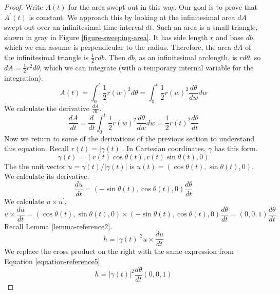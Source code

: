 \documentclass[fleqn,letterpaper]{report}
\begin{document}
\begin{proof}
Write $A(t)$ for the area swept out in this way. Our goal is
to prove that $A^\prime(t)$ is constant. We approach this by
looking at the infinitesimal area $dA$ swept out over an
infinitesimal time interval $dt$. Such an area is a small
triangle, shown in gray in Figure \ref{figure-sweeping-area}. It has
side length $r$ and base $db$, which we can assume is
perpendicular to the radius.  Therefore, the area $dA$ of the
infinitesimal triangle is $\frac{1}{2} r db$. Then $db$, as an
infinitesimal arclength, is $rd\theta$, so $dA = \frac{1}{2}
r^2 d\theta$, which we can integrate (with a temporary
internal variable for the integration).
\begin{equation*}
A(t) = \int_0^t \frac{1}{2} r(w)^2 d\theta = \int_0^t \frac{1}{2}
r(w)^2 \frac{d\theta}{dw} dw 
\end{equation*}
We calculate the derivative $\frac{dA}{dt}$.
\begin{equation*}
\frac{dA}{dt} = \frac{d}{dt} \int_0^t \frac{1}{2} r(w)^2
\frac{d\theta}{dw} dw = \frac{1}{2} r(t)^2 \frac{d\theta}{dt}
\end{equation*}
Now we return to some of the derivations of the previous section
to understand this equation. Recall $r(t) = |\gamma(t)|$. In
Cartesian coordinates, $\gamma$ has this form.
\begin{equation*}
\gamma(t) = (r(t) \cos \theta(t), r(t) \sin \theta(t), 0) 
\end{equation*}
The the unit vector $u = \gamma(t) / |\gamma(t)|$ is $u(t) =
(\cos \theta (t), \sin \theta(t),0)$. We calculate its
derivative.
\begin{equation}
\label{equation-reference6}
\frac{du}{dt} = (-\sin \theta(t), \cos \theta(t), 0)
\frac{d\theta}{dt} 
\end{equation}
We calculate $u \times u^\prime$.
\begin{equation}
\label{equation-reference5}
u \times \frac{du}{dt} = (\cos \theta(t), \sin \theta(t), 0)
\times (-\sin \theta(t), \cos \theta(t), 0) \frac{d\theta}{dt} =
(0,0,1) \frac{d\theta}{dt}
\end{equation}
Recall Lemma \ref{lemma-reference2}.
\begin{equation*}
h = |\gamma(t)|^2 u \times \frac{du}{dt} 
\end{equation*}
We replace the cross product on the right with the same
expression from Equation \ref{equation-reference5}.
\begin{equation*}
h = |\gamma(t)|^2 \frac{d\theta}{dt} (0,0,1)

\end{equation*}
\end{proof}
\end{document}

